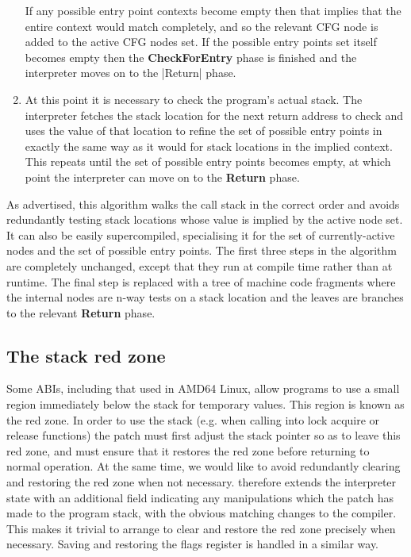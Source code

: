 \begin{enumerate}
  If any possible entry point contexts become empty then that implies
  that the entire context would match completely, and so the relevant
  CFG node is added to the active CFG nodes set.  If the possible
  entry points set itself becomes empty then the
  \textbf{CheckForEntry} phase is finished and the interpreter moves
  on to the |Return| phase.

\item At this point it is necessary to check the program's actual
  stack.  The interpreter fetches the stack location for the next
  return address to check and uses the value of that location to
  refine the set of possible entry points in exactly the same way as
  it would for stack locations in the implied context.  This repeats
  until the set of possible entry points becomes empty, at which point
  the interpreter can move on to the \textbf{Return} phase.
\end{enumerate}
  
As advertised, this algorithm walks the call stack in the correct
order and avoids redundantly testing stack locations whose value is
implied by the active node set.  It can also be easily supercompiled,
specialising it for the set of currently-active nodes and the set of
possible entry points.  The first three steps in the algorithm are
completely unchanged, except that they run at compile time rather than
at runtime.  The final step is replaced with a tree of machine code
fragments where the internal nodes are n-way tests on a stack location
and the leaves are branches to the relevant \textbf{Return} phase.

\subsection{The stack red zone}

Some ABIs, including that used in AMD64 Linux, allow programs to use a
small region immediately below the stack for temporary values.  This
region is known as the red zone.  In order to use the stack (e.g. when
calling into lock acquire or release functions) the patch must first
adjust the stack pointer so as to leave this red zone, and must ensure
that it restores the red zone before returning to normal operation.
At the same time, we would like to avoid redundantly clearing and
restoring the red zone when not necessary.  {\Implementation}
therefore extends the interpreter state with an additional field
indicating any manipulations which the patch has made to the program
stack, with the obvious matching changes to the compiler.  This makes
it trivial to arrange to clear and restore the red zone precisely when
necessary.  Saving and restoring the flags register is handled in a
similar way.

